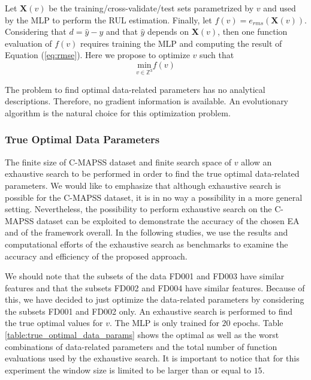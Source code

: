 \documentclass[preprint,12pt]{elsarticle}%
\begin{document}
Let $\mathbf{X}(v)$ be the training/cross-validate/test sets parametrized by $v$ and
used by the MLP to perform the RUL estimation. Finally, let $f(v)=e_{rms}%
(\mathbf{X}(v))$. Considering that $d = \hat{y} - y$ and that
$\hat{y}$ depends on $\mathbf{X}(v)$, then one function evaluation of $f(v)$
requires training the MLP and computing the result of Equation (\ref{eq:rmse}).
Here we propose to optimize $v$ such that
\begin{equation}
\underset{v \in\mathbb{Z}^{3}}{\mathrm{min}} f(v)
\label{eq:optimization_problem}%
\end{equation}

The problem to find optimal data-related parameters has no analytical
descriptions. Therefore, no gradient information is available. An evolutionary
algorithm is the natural choice for this optimization problem.

\subsubsection{True Optimal Data Parameters}

The finite size of C-MAPSS dataset and finite search space 
of $v$ allow an exhaustive
search to be performed in order to find the true optimal data-related
parameters. We would like to emphasize that although exhaustive search is possible for the C-MAPSS dataset, it is in no way a possibility in a more general
setting. Nevertheless, the possibility to perform exhaustive search on the
C-MAPSS dataset can be exploited to demonstrate the accuracy of the chosen EA
and of the framework overall. In the following studies, we use the results and
computational efforts of the exhaustive search as benchmarks to examine the
accuracy and efficiency of the proposed approach.

We should note that the subsets of the data FD001 and FD003 have similar
features and that the subsets FD002 and FD004 have similar features. Because
of this, we have decided to just optimize the data-related parameters by
considering the subsets FD001 and FD002 only. An exhaustive search is
performed to find the true optimal values for $v$. 
The MLP is only trained for $20$ epochs. Table
\ref{table:true_optimal_data_params} shows the optimal as well as the worst
combinations of data-related parameters and the total number of function
evaluations used by the exhaustive search. It is important to notice that for 
this experiment the window size is limited to be larger than or equal to $15$.
\end{document}
